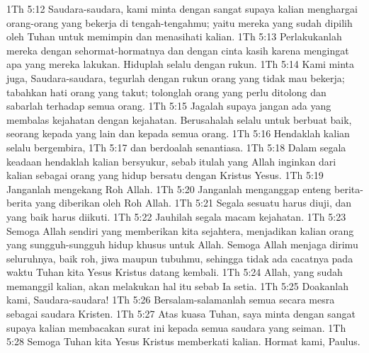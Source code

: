 1Th 5:12  Saudara-saudara, kami minta dengan sangat supaya kalian menghargai orang-orang yang bekerja di tengah-tengahmu; yaitu mereka yang sudah dipilih oleh Tuhan untuk memimpin dan menasihati kalian.
1Th 5:13  Perlakukanlah mereka dengan sehormat-hormatnya dan dengan cinta kasih karena mengingat apa yang mereka lakukan. Hiduplah selalu dengan rukun.
1Th 5:14  Kami minta juga, Saudara-saudara, tegurlah dengan rukun orang yang tidak mau bekerja; tabahkan hati orang yang takut; tolonglah orang yang perlu ditolong dan sabarlah terhadap semua orang.
1Th 5:15  Jagalah supaya jangan ada yang membalas kejahatan dengan kejahatan. Berusahalah selalu untuk berbuat baik, seorang kepada yang lain dan kepada semua orang.
1Th 5:16  Hendaklah kalian selalu bergembira,
1Th 5:17  dan berdoalah senantiasa.
1Th 5:18  Dalam segala keadaan hendaklah kalian bersyukur, sebab itulah yang Allah inginkan dari kalian sebagai orang yang hidup bersatu dengan Kristus Yesus.
1Th 5:19  Janganlah mengekang Roh Allah.
1Th 5:20  Janganlah menganggap enteng berita-berita yang diberikan oleh Roh Allah.
1Th 5:21  Segala sesuatu harus diuji, dan yang baik harus diikuti.
1Th 5:22  Jauhilah segala macam kejahatan.
1Th 5:23  Semoga Allah sendiri yang memberikan kita sejahtera, menjadikan kalian orang yang sungguh-sungguh hidup khusus untuk Allah. Semoga Allah menjaga dirimu seluruhnya, baik roh, jiwa maupun tubuhmu, sehingga tidak ada cacatnya pada waktu Tuhan kita Yesus Kristus datang kembali.
1Th 5:24  Allah, yang sudah memanggil kalian, akan melakukan hal itu sebab Ia setia.
1Th 5:25  Doakanlah kami, Saudara-saudara!
1Th 5:26  Bersalam-salamanlah semua secara mesra sebagai saudara Kristen.
1Th 5:27  Atas kuasa Tuhan, saya minta dengan sangat supaya kalian membacakan surat ini kepada semua saudara yang seiman.
1Th 5:28  Semoga Tuhan kita Yesus Kristus memberkati kalian. Hormat kami, Paulus.


